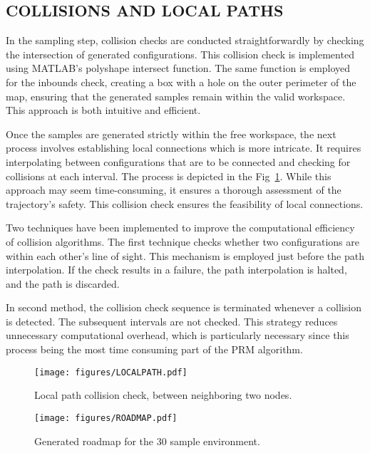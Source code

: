 \documentclass{IEEEtaes}
\begin{document}
\subsection{\fontsize{10}{13}\selectfont COLLISIONS AND LOCAL PATHS}
In the sampling step, collision checks are conducted straightforwardly by checking the intersection of generated configurations. This collision check is implemented using MATLAB's polyshape intersect function. The same function is employed for the inbounds check, creating a box with a hole on the outer perimeter of the map, ensuring that the generated samples remain within the valid workspace. This approach is both intuitive and efficient.

Once the samples are generated strictly within the free workspace, the next process involves establishing local connections which is more intricate.  It requires interpolating between configurations that are to be connected and checking for collisions at each interval. The process is depicted in the Fig~\ref{local-path}. While this approach may seem time-consuming, it ensures a thorough assessment of the trajectory's safety. This collision check ensures the feasibility of local connections.

Two techniques have been implemented to improve the computational efficiency of collision algorithms. The first technique checks whether two configurations are within each other's line of sight. This mechanism is employed just before the path interpolation. If the check results in a failure, the path interpolation is halted, and the path is discarded.

In second method, the collision check sequence is terminated whenever a collision is detected. The subsequent intervals are not checked. This strategy reduces unnecessary computational overhead, which is particularly necessary since this process being the most time consuming part of the PRM algorithm.

\begin{figure}[b]
    \vspace{0.75em}
    \begin{center}
        \texttt{[image: figures/LOCALPATH.pdf]}
     \end{center}
     \caption{Local path collision check, between neighboring two nodes.}
     \label{local-path}
\end{figure}

\begin{figure}[t]
    \begin{center}
        \texttt{[image: figures/ROADMAP.pdf]}
     \end{center}
     \vspace{-1.5em}
     \caption{Generated roadmap for the 30 sample environment.}
     \label{roadmap}
    \vspace{-1em}
\end{figure}
\end{document}
